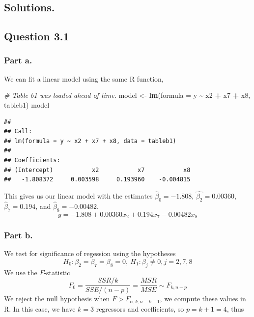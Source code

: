 \documentclass[
  11pt,
]{article}
\newenvironment{Shaded}{\begin{snugshade}}{\end{snugshade}}
\newcommand{\AttributeTok}[1]{\textcolor[rgb]{0.13,0.29,0.53}{#1}}
\newcommand{\CommentTok}[1]{\textcolor[rgb]{0.56,0.35,0.01}{\textit{#1}}}
\newcommand{\FunctionTok}[1]{\textcolor[rgb]{0.13,0.29,0.53}{\textbf{#1}}}
\newcommand{\NormalTok}[1]{#1}
\newcommand{\OtherTok}[1]{\textcolor[rgb]{0.56,0.35,0.01}{#1}}
\newcommand{\SpecialCharTok}[1]{\textcolor[rgb]{0.81,0.36,0.00}{\textbf{#1}}}
\begin{document}
\subsection{Solutions.}\label{solutions.}

\subsection{Question 3.1}\label{question-3.1-1}

\subsubsection{Part a.}\label{part-a.-1}

We can fit a linear model using the same R function,

\begin{Shaded}
\begin{Highlighting}[]
  \CommentTok{\# Table b1 was loaded ahead of time.}
\NormalTok{  model }\OtherTok{\textless{}{-}} \FunctionTok{lm}\NormalTok{(}\AttributeTok{formula =}\NormalTok{ y }\SpecialCharTok{\textasciitilde{}}\NormalTok{ x2 }\SpecialCharTok{+}\NormalTok{ x7 }\SpecialCharTok{+}\NormalTok{ x8, tableb1)}
\NormalTok{  model}
\end{Highlighting}
\end{Shaded}

\begin{verbatim}
## 
## Call:
## lm(formula = y ~ x2 + x7 + x8, data = tableb1)
## 
## Coefficients:
## (Intercept)           x2           x7           x8  
##   -1.808372     0.003598     0.193960    -0.004815
\end{verbatim}

This gives us our linear model with the estimates
\(\hat{\beta}_0 = -1.808\), \(\hat{\beta_2} = 0.00360\),
\(\hat{\beta}_7 = 0.194\), and \(\hat{\beta}_8 = -0.00482\).
\[y = -1.808 + 0.00360x_2 + 0.194x_7 -0.00482x_8\]

\subsubsection{Part b.}\label{part-b.-1}

We test for significance of regession using the hypotheses
\[H_0: \beta_2 = \beta_7 = \beta_8 = 0, \ H_1: \beta_j \neq 0, j = 2,7,8\]
We use the \(F\)-statistic
\[F_0 = \frac{SSR/k}{SSE/(n-p)} = \frac{MSR}{MSE}\sim F_{k,n-p}\] We
reject the null hypothesis when \(F > F_{\alpha, k, n-k-1}\), we compute
these values in R. In this case, we have \(k=3\) regressors and
coefficients, so \(p = k+1 = 4\), thus
\end{document}
